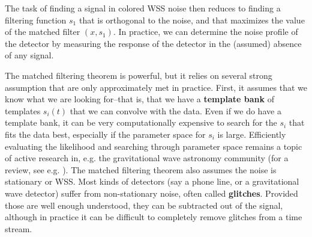 The task of finding a signal in colored WSS noise then reduces to
finding a filtering function $s_1$ that is orthogonal to the noise,
and that maximizes the value of the matched filter $\left(x,s_1\right)$.
In practice, we can determine the noise profile of the detector by
measuring the response of the detector in the (assumed) absence of any signal.

The matched filtering theorem is powerful, but it relies on several strong assumption
that are only approximately met in practice. 
First, it assumes that we know what we are looking for--that is, that we have a 
\textbf{template bank} of templates $s_i(t)$ that we can convolve with the data.
Even if we do have a template bank, it can be very computationally expensive to
search for the $s_i$ that fits the data best, especially if the parameter space
for $s_i$ is large. 
Efficiently evaluating the likelihood and searching through parameter space remains
a topic of active research in, e.g. the gravitational wave astronomy community
(for a review, see e.g. \cite{Creighton:2011zz}).
The matched filtering theorem also assumes the noise is stationary or WSS. 
Most kinds of detectors (say a phone line, or a gravitational wave detector) suffer
from non-stationary noise, often called \textbf{glitches}.
Provided those are well enough understood, they can be subtracted out of the signal,
although in practice it can be difficult to completely remove glitches from a time stream.
